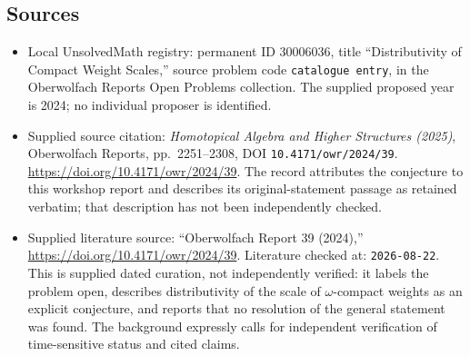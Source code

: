 \documentclass[11pt]{article}
\begin{document}
\subsection{Sources}
\begin{itemize}
\item Local UnsolvedMath registry: permanent ID \(30006036\), title ``Distributivity of Compact Weight Scales,'' source problem code \texttt{catalogue entry}, in the Oberwolfach Reports Open Problems collection. The supplied proposed year is 2024; no individual proposer is identified.
\item Supplied source citation: \emph{Homotopical Algebra and Higher Structures (2025)}, Oberwolfach Reports, pp.\ 2251--2308, DOI \texttt{10.4171/owr/2024/39}. \url{https://doi.org/10.4171/owr/2024/39}. The record attributes the conjecture to this workshop report and describes its original-statement passage as retained verbatim; that description has not been independently checked.
\item Supplied literature source: ``Oberwolfach Report 39 (2024),'' \url{https://doi.org/10.4171/owr/2024/39}. Literature checked at: \texttt{2026-08-22}. This is supplied dated curation, not independently verified: it labels the problem open, describes distributivity of the scale of \(\omega\)-compact weights as an explicit conjecture, and reports that no resolution of the general statement was found. The background expressly calls for independent verification of time-sensitive status and cited claims.
\end{itemize}
\end{document}
